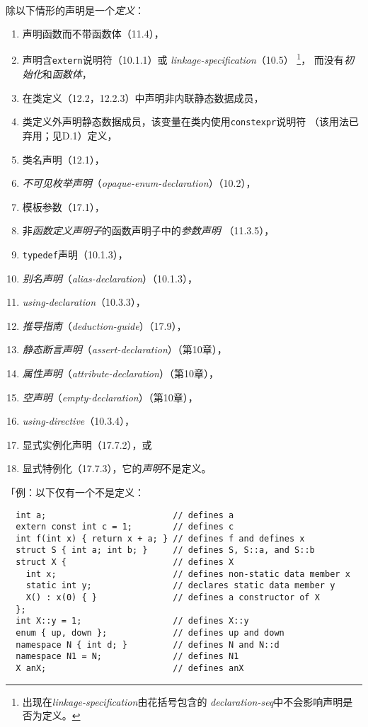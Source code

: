 \paragraph{}
除以下情形的声明是一个\textit{定义}：
\begin{enumerate}
  \item{声明函数而不带函数体（11.4），}
  \item{声明含\texttt{extern}说明符（10.1.1）或
      \textit{linkage-specification}（10.5）
        \footnote{出现在\textit{linkage-specification}由花括号包含的
             \textit{declaration-seq}中不会影响声明是否为定义。}，
        而没有\textit{初始化}和\textit{函数体}，}
  \item{在类定义（12.2，12.2.3）中声明非内联静态数据成员，}
  \item{类定义外声明静态数据成员，该变量在类内使用\texttt{constexpr}说明符
    （该用法已弃用；见D.1）定义，}
  \item{类名声明（12.1），}
  \item{\textit{不可见枚举声明}（\textit{opaque-enum-declaration}）（10.2），}
  \item{模板参数（17.1），}
  \item{非\textit{函数定义}\textit{声明子}的函数声明子中的\textit{参数声明}
    （11.3.5），}
  \item{\texttt{typedef}声明（10.1.3），}
  \item{\textit{别名声明}（\textit{alias-declaration}）（10.1.3），}
  \item{\textit{using-declaration}（10.3.3），}
  \item{\textit{推导指南}（\textit{deduction-guide}）（17.9），}
  \item{\textit{静态断言声明}（\textit{assert-declaration}）（第10章），}
  \item{\textit{属性声明}（\textit{attribute-declaration}）（第10章），}
  \item{\textit{空声明}（\textit{empty-declaration}）（第10章），}
  \item{\textit{using-directive}（10.3.4），}
  \item{显式实例化声明（17.7.2），或}
  \item{显式特例化（17.7.3），它的\textit{声明}不是定义。}
\end{enumerate}
「例：以下仅有一个不是定义：
\begin{lstlisting}
  int a;                         // defines a
  extern const int c = 1;        // defines c
  int f(int x) { return x + a; } // defines f and defines x
  struct S { int a; int b; }     // defines S, S::a, and S::b
  struct X {                     // defines X
    int x;                       // defines non-static data member x
    static int y;                // declares static data member y
    X() : x(0) { }               // defines a constructor of X
  };
  int X::y = 1;                  // defines X::y
  enum { up, down };             // defines up and down
  namespace N { int d; }         // defines N and N::d
  namespace N1 = N;              // defines N1
  X anX;                         // defines anX
\end{lstlisting}
